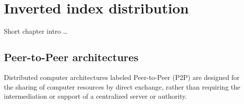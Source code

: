 \chapter{Inverted index distribution}

Short chapter intro \ldots

\section{Peer-to-Peer architectures}
Distributed computer architectures labeled Peer-to-Peer (P2P) are designed for the sharing of computer resources by direct exchange, rather than requiring the intermediation or support of a centralized server or authority.

